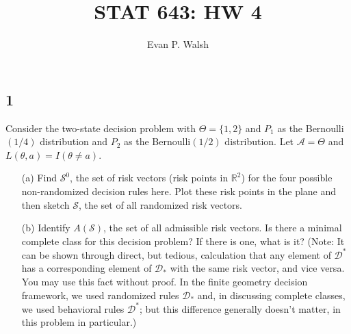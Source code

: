 \documentclass[12pt]{article}
\title{STAT 643: HW 4}
\author{Evan P. Walsh}
\begin{document}
\maketitle


\newcommand{\E}{\mathrm{E}}
\newcommand{\D}{\mathcal{D}}
\newcommand{\A}{\mathcal{A}}
\newcommand{\X}{\mathcal{X}}
\newcommand{\p}{\phi}
\newcommand{\ta}{\theta}
\renewcommand{\baselinestretch}{1}

\subsection*{1}
\begin{tcolorbox}
  Consider the two-state decision problem with $\Theta=\{1,2\}$ and $P_1$ as the Bernoulli$(1/4)$ distribution and
  $P_2$ as the Bernoulli$(1/2)$ distribution. Let $\mathcal{A}=\Theta$ and $L(\theta,a)=I(\theta \neq a)$.
  \begin{enumerate}
    \item[(a)] Find $\mathcal{S}^0$, the set of risk vectors (risk points in $\mathbb{R}^2$) for the four possible non-randomized decision rules here.  Plot these risk points in the plane and then sketch $\mathcal{S}$, the set of all randomized risk vectors.
    \item[(b)] Identify $A(\mathcal{S})$, the set of all admissible risk vectors.  Is there a minimal complete class for this decision problem? If there is one, what is it?  (Note: It can be shown through direct, but tedious, calculation that any element of $\mathcal{D}^*$ has a corresponding element of $\mathcal{D}_*$ with the same risk vector, and vice versa.  You may use this fact without proof. In the finite geometry decision framework, we used randomized rules $\mathcal{D}_*$ and, in discussing complete classes, we used behavioral rules $\mathcal{D}^*$; but this difference generally doesn't matter, in this problem in particular.)
  \end{enumerate}
\end{tcolorbox}
\end{document}
